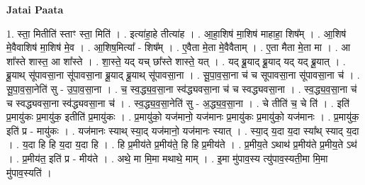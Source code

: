 \documentclass[17pt]{extarticle}
\begin{document}
\textbf{Jatai Paata} \newline

1. स्ता॒ मितीति॑ स्ताꣳ स्ता॒ मिति॑ । . इत्या॑हा॒हे तीत्या॑ह । . आ॒हा॒शिष॑ मा॒शिष॑ माहाहा॒ शिष᳚म् । . आ॒शिष॑ मे॒वैवाशिष॑ मा॒शिष॑ मे॒व । . आ॒शिष॒मित्या᳚ - शिष᳚म् । . ए॒वैता मे॒ता मे॒वैवैताम् । . ए॒ता मैता मे॒ता मा । . आ शा᳚स्ते शास्त॒ आ शा᳚स्ते । . शा॒स्ते॒ यद् यच् छा᳚स्ते शास्ते॒ यत् । . यद् ब्रू॒याद् ब्रू॒याद् यद् यद् ब्रू॒यात् । . ब्रू॒याथ् सू॑पावसा॒ना सू॑पावसा॒ना ब्रू॒याद् ब्रू॒याथ् सू॑पावसा॒ना । . सू॒पा॒व॒सा॒ना च॑ च सूपावसा॒ना सू॑पावसा॒ना च॑ । . सू॒पा॒व॒सा॒नेति॑ सु - उ॒पा॒व॒सा॒ना । . च॒ स्व॒द्ध्य॒व॒सा॒ना स्व॑द्ध्यवसा॒ना च॑ च स्वद्ध्यवसा॒ना । . स्व॒द्ध्य॒व॒सा॒ना च॑ च स्वद्ध्यवसा॒ना स्व॑द्ध्यवसा॒ना च॑ । . स्व॒द्ध्य॒व॒सा॒नेति॑ सु - अ॒द्ध्य॒व॒सा॒ना । . चे तीति॑ च॒ चे ति॑ । . इति॑ प्र॒मायु॑कः प्र॒मायु॑क॒ इतीति॑ प्र॒मायु॑कः । . प्र॒मायु॑को॒ यज॑मानो॒ यज॑मानः प्र॒मायु॑कः प्र॒मायु॑को॒ यज॑मानः । . प्र॒मायु॑क॒ इति॑ प्र - मायु॑कः । . यज॑मानः स्याथ् स्या॒द् यज॑मानो॒ यज॑मानः स्यात् । . स्या॒द् य॒दा य॒दा स्या᳚थ् स्याद् य॒दा । . य॒दा हि हि य॒दा य॒दा हि । . हि प्र॒मीय॑ते प्र॒मीय॑ते॒ हि हि प्र॒मीय॑ते । . प्र॒मीय॒ते ऽथाथ॑ प्र॒मीय॑ते प्र॒मीय॒ते ऽथ॑ । . प्र॒मीय॑त॒ इति॑ प्र - मीय॑ते । . अथे॒ मा मि॒मा मथाथे॒ माम् । . इ॒मा मु॑पाव॒स्य त्यु॑पाव॒स्यती॒मा मि॒मा मु॑पाव॒स्यति॑ । \newline
\end{document}

